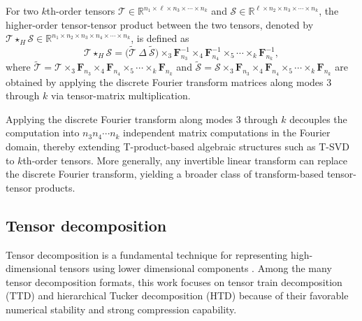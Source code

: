 \documentclass[onefignum,onetabnum]{siamart250211}
\begin{document}
\begin{definition} 
For two $k$th-order tensors
$\mathscr{T}\in\mathbb{R}^{n_1\times \ell\times n_3\times \cdots\times n_k}$ and $\mathscr{S}\in\mathbb{R}^{\ell\times n_2\times n_3\times \cdots\times n_k}$,
the higher-order tensor-tensor product between the two tensors, denoted by $\mathscr{T}\star_H \mathscr{S}\in\mathbb{R}^{n_1\times n_2\times n_3\times n_4\times \cdots\times n_k}$, is defined  as
\begin{equation}
\label{eq:kthorderTprod}
\mathscr{T}\star_H \mathscr{S}
=
\bigl(\widetilde{\mathscr{T}}\ \Delta\ \widetilde{\mathscr{S}}\bigr)
\times_3 \textbf{F}_{n_3}^{-1}
\times_4 \textbf{F}_{n_4}^{-1}
\times_5\cdots
\times_k \textbf{F}_{n_k}^{-1},
\end{equation}
where $\widetilde{\mathscr{T}}
=
\mathscr{T}
\times_3 \textbf{F}_{n_3}
\times_4 \textbf{F}_{n_4}
\times_5\cdots
\times_k \textbf{F}_{n_k}$ and $
\widetilde{\mathscr{S}}
=
\mathscr{S}
\times_3 \textbf{F}_{n_3}
\times_4 \textbf{F}_{n_4}
\times_5\cdots
\times_k \textbf{F}_{n_k}$ are obtained by applying the discrete Fourier transform matrices along modes $3$ through $k$ via tensor-matrix multiplication.
\end{definition}


Applying the discrete Fourier transform along modes $3$ through $k$ decouples the
computation into $n_3n_4\cdots n_k$ independent matrix computations in the Fourier
domain, thereby extending T-product-based algebraic structures such as T-SVD to
$k$th-order tensors. More generally, any invertible linear transform can replace the
discrete Fourier transform, yielding a broader class of transform-based tensor-tensor products.


\subsection{Tensor decomposition} Tensor decomposition is a fundamental technique for representing high-dimensional tensors using lower dimensional components \cite{kolda2009tensor}. Among the many tensor decomposition formats, this work focuses on tensor train decomposition (TTD) \cite{oseledets2011tensor} and hierarchical Tucker decomposition (HTD) \cite{grasedyck2010hierarchical} because of their favorable numerical stability and strong compression capability.
\end{document}
